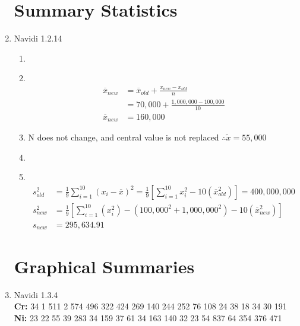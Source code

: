 \documentclass[11pt]{article}
\newcommand\Item[1][]{%
  \ifx\relax#1\relax  \item \else \item[#1] \fi
  \abovedisplayskip=0pt\abovedisplayshortskip=0pt~\vspace*{-\baselineskip}}
\begin{document}
\begin{enumerate}
\section*{Summary Statistics}
        \item Navidi 1.2.14
        \begin{enumerate}
                \Item  
                \begin{align*}  
                        \overline{x}_{new} &= \overline{x}_{old} + \frac{x_{new} - x_{old}}{n} \\
                        &= 70,000 + \frac{1,000,000 - 100,000}{10} \\
                        \overline{x}_{new} &= 160,000
                \end{align*}
                \item  N does not change, and central value is not replaced $\therefore \tilde{x} = 55,000$
                \Item   
                \begin{align*}
                        s^{2}_{old} &= \frac{1}{9} \sum_{i=1}^{10}(x_{i} - \overline{x})^{2} = \frac{1}{9} [\sum_{i=1}^{10}x_{i}^{2} - 10(\overline{x}^2_{old})] = 400,000,000 \\
                        s^{2}_{new} &=  \frac{1}{9} [\sum_{i=1}^{10}(x_{i}^{2})-(100,000^{2}+1,000,000^{2}) - 10(\overline{x}^2_{new})] \\
                        s_{new} &= 295,634.91
                \end{align*}
        \end{enumerate}

\newpage
\section*{Graphical Summaries}
        \item Navidi 1.3.4 \\
        \textbf{Cr:} 34 1 511 2 574 496 322 424 269 140 244 252 76 108 24 38 18 34 30 191\\
        \textbf{Ni:} 23 22 55 39 283 34 159 37 61 34 163 140 32 23 54 837 64 354 376 471


\end{enumerate}
\end{document}
